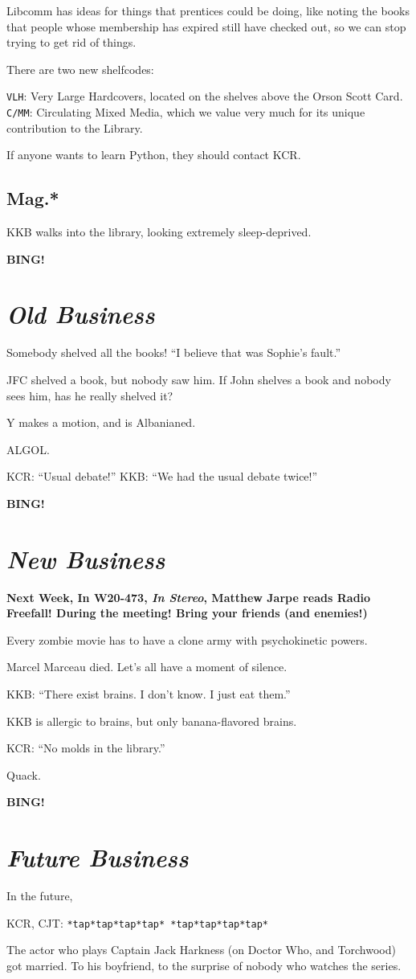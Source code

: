 \documentclass[10pt]{article}
\newcommand{\bing}{{\bf BING!} }
\newcommand{\goto}[1]{\bing \vskip 12pt \section*{{\em{#1}}}}
\begin{document}
Libcomm has ideas for things that prentices could be doing, like noting the books that people whose membership has expired still have checked out, so we
can stop trying to get rid of things.

There are two new shelfcodes:

\texttt{VLH}: Very Large Hardcovers, located on the shelves above the Orson Scott Card.
\texttt{C/MM}:  Circulating Mixed Media, which we value very much for its unique contribution to the Library.

If anyone wants to learn Python, they should contact KCR.

\subsection*{Mag.*}

KKB walks into the library, looking extremely sleep-deprived.

\goto{Old Business}

Somebody shelved all the books!  ``I believe that was Sophie's fault.''

JFC shelved a book, but nobody saw him.  If John shelves a book and nobody sees him, has he really shelved it?

Y makes a motion, and is Albanianed.

ALGOL.

KCR:  ``Usual debate!''
KKB:  ``We had the usual debate twice!''

\goto{New Business}

\textbf{Next Week, In W20-473, \emph{In Stereo}, Matthew Jarpe reads Radio Freefall!  During the meeting!  Bring your friends (and enemies!)}

Every zombie movie has to have a clone army with psychokinetic powers.

Marcel Marceau died.  Let's all have a moment of silence.

KKB:  ``There exist brains.  I don't know.  I just eat them.''

KKB is allergic to brains, but only banana-flavored brains.

KCR: ``No molds in the library.''

Quack.

\goto{Future Business}

In the future, 

KCR, CJT: \texttt{*tap*tap*tap*tap* *tap*tap*tap*tap*}

The actor who plays Captain Jack Harkness (on Doctor Who, and Torchwood) got married.  To his boyfriend, to the surprise of nobody who watches the series.
\end{document}
